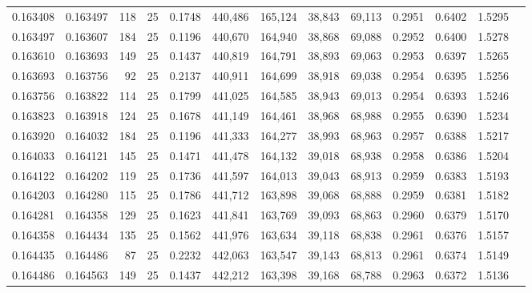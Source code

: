 \begin{tabular}{rrrrrrrrrrrrr}
0.163408 & 0.163497 &   118 &  25 &                                     0.1748 & 440,486 & 165,124 &  38,843 &  69,113 & 0.2951 & 0.6402 & 1.5295 \\
0.163497 & 0.163607 &   184 &  25 &                                     0.1196 & 440,670 & 164,940 &  38,868 &  69,088 & 0.2952 & 0.6400 & 1.5278 \\
0.163610 & 0.163693 &   149 &  25 &                                     0.1437 & 440,819 & 164,791 &  38,893 &  69,063 & 0.2953 & 0.6397 & 1.5265 \\
0.163693 & 0.163756 &    92 &  25 &                                     0.2137 & 440,911 & 164,699 &  38,918 &  69,038 & 0.2954 & 0.6395 & 1.5256 \\
0.163756 & 0.163822 &   114 &  25 &                                     0.1799 & 441,025 & 164,585 &  38,943 &  69,013 & 0.2954 & 0.6393 & 1.5246 \\
0.163823 & 0.163918 &   124 &  25 &                                     0.1678 & 441,149 & 164,461 &  38,968 &  68,988 & 0.2955 & 0.6390 & 1.5234 \\
0.163920 & 0.164032 &   184 &  25 &                                     0.1196 & 441,333 & 164,277 &  38,993 &  68,963 & 0.2957 & 0.6388 & 1.5217 \\
0.164033 & 0.164121 &   145 &  25 &                                     0.1471 & 441,478 & 164,132 &  39,018 &  68,938 & 0.2958 & 0.6386 & 1.5204 \\
0.164122 & 0.164202 &   119 &  25 &                                     0.1736 & 441,597 & 164,013 &  39,043 &  68,913 & 0.2959 & 0.6383 & 1.5193 \\
0.164203 & 0.164280 &   115 &  25 &                                     0.1786 & 441,712 & 163,898 &  39,068 &  68,888 & 0.2959 & 0.6381 & 1.5182 \\
0.164281 & 0.164358 &   129 &  25 &                                     0.1623 & 441,841 & 163,769 &  39,093 &  68,863 & 0.2960 & 0.6379 & 1.5170 \\
0.164358 & 0.164434 &   135 &  25 &                                     0.1562 & 441,976 & 163,634 &  39,118 &  68,838 & 0.2961 & 0.6376 & 1.5157 \\
0.164435 & 0.164486 &    87 &  25 &                                     0.2232 & 442,063 & 163,547 &  39,143 &  68,813 & 0.2961 & 0.6374 & 1.5149 \\
0.164486 & 0.164563 &   149 &  25 &                                     0.1437 & 442,212 & 163,398 &  39,168 &  68,788 & 0.2963 & 0.6372 & 1.5136 \\

\end{tabular}
